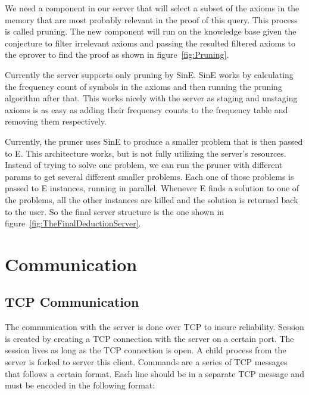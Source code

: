 We need a component in our server that will select a subset of the axioms in the memory that are most probably relevant in the proof of this query. This process is called pruning. The new component will run on the knowledge base given the conjecture to filter irrelevant axioms and passing the resulted filtered axioms to the eprover to find the proof as shown in figure~\ref{fig:Pruning}.


Currently the server supports only pruning by SinE. SinE works by calculating the frequency count of symbols in the axioms and then running the pruning algorithm after that. This works nicely with the server as staging and unstaging axioms is as easy as adding their frequency counts to the frequency table and removing them respectively.

Currently, the pruner uses SinE to produce a smaller problem that is then passed to E. This architecture works, but is not fully utilizing the server's resources. Instead of trying to solve one problem, we can run the pruner with different params to get several different smaller problems. Each one of those problems is passed to E instances, running in parallel. Whenever E finds a solution to one of the problems, all the other instances are killed and the solution is returned back to the user. So the final server structure is the one shown in figure~\ref{fig:TheFinalDeductionServer}.


\section{Communication}
\subsection{TCP Communication}\label{subsec:tcpCommunication}
The communication with the server is done over TCP to insure reliability. Session is created by creating a TCP connection with the server on a certain port. The session lives as long as the TCP connection is open. A child process from the server is forked to server this client. Commands are a series of TCP messages that follows a certain format. Each line should be in a separate TCP message and must be encoded in the following format:

